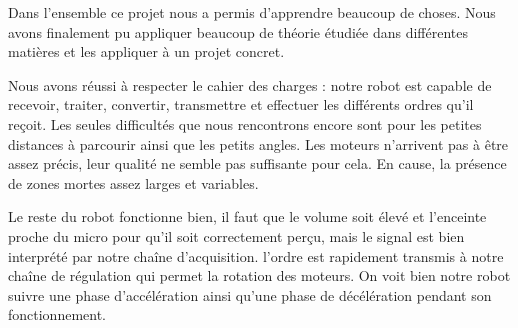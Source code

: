 Dans l’ensemble ce projet nous a permis d’apprendre beaucoup de choses. Nous avons finalement pu appliquer beaucoup de théorie étudiée dans différentes matières et les appliquer à un projet concret. 

Nous avons réussi à respecter le cahier des charges : notre robot est capable de recevoir, traiter, convertir, transmettre et effectuer les différents ordres qu’il reçoit. Les seules difficultés que nous rencontrons encore sont pour les petites distances à parcourir ainsi que les petits angles. Les moteurs n’arrivent pas à être assez précis, leur qualité ne semble pas suffisante pour cela. En cause, la présence de zones mortes assez larges et variables. 

Le reste du robot fonctionne bien, il faut que le volume soit élevé et l’enceinte proche du micro pour qu'il soit correctement perçu, mais le signal est bien interprété par notre chaîne d’acquisition. l’ordre est rapidement transmis à notre chaîne de régulation qui permet la rotation des moteurs. On voit bien notre robot suivre une phase d’accélération ainsi qu’une phase de décélération pendant son fonctionnement. 
